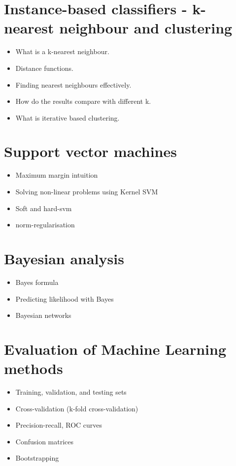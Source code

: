 \documentclass[11pt]{article}
\begin{document}
\section{Instance-based classifiers - k-nearest neighbour and clustering}
\label{sec:org5355ddd}

\begin{itemize}
\item What is a k-nearest neighbour.
\item Distance functions.
\item Finding nearest neighbours effectively.
\item How do the results compare with different k.
\item What is iterative based clustering.
\end{itemize}

\section{Support vector machines}
\label{sec:org9bb7b4a}

\begin{itemize}
\item Maximum margin intuition
\item Solving non-linear problems using Kernel SVM
\item Soft and hard-svm
\item norm-regularisation
\end{itemize}

\section{Bayesian analysis}
\label{sec:org99ed39c}

\begin{itemize}
\item Bayes formula
\item Predicting likelihood with Bayes
\item Bayesian networks
\end{itemize}

\section{Evaluation of Machine Learning methods}
\label{sec:org71d835c}

\begin{itemize}
\item Training, validation, and testing sets
\item Cross-validation (k-fold cross-validation)
\item Precision-recall, ROC curves
\item Confusion matrices
\item Bootstrapping
\end{itemize}
\end{document}

